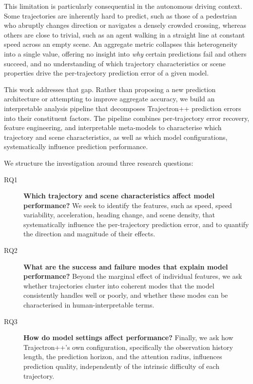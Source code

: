 \documentclass[12pt]{article}
\begin{document}
This limitation is particularly consequential in the autonomous driving context. Some trajectories are inherently hard to predict, such as those of a pedestrian who abruptly changes direction or navigates a densely crowded crossing, whereas others are close to trivial, such as an agent walking in a straight line at constant speed across an empty scene. An aggregate metric collapses this heterogeneity into a single value, offering no insight into \emph{why} certain predictions fail and others succeed, and no understanding of which trajectory characteristics or scene properties drive the per-trajectory prediction error of a given model.

This work addresses that gap. Rather than proposing a new prediction architecture or attempting to improve aggregate accuracy, we build an interpretable analysis pipeline that decomposes Trajectron++ prediction errors into their constituent factors. The pipeline combines per-trajectory error recovery, feature engineering, and interpretable meta-models to characterise which trajectory and scene characteristics, as well as which model configurations, systematically influence prediction performance.

We structure the investigation around three research questions:

\begin{description}
  \item[RQ1] \textbf{Which trajectory and scene characteristics affect model performance?} We seek to identify the features, such as speed, speed variability, acceleration, heading change, and scene density, that systematically influence the per-trajectory prediction error, and to quantify the direction and magnitude of their effects.

  \item[RQ2] \textbf{What are the success and failure modes that explain model performance?} Beyond the marginal effect of individual features, we ask whether trajectories cluster into coherent modes that the model consistently handles well or poorly, and whether these modes can be characterised in human-interpretable terms.

  \item[RQ3] \textbf{How do model settings affect performance?} Finally, we ask how Trajectron++'s own configuration, specifically the observation history length, the prediction horizon, and the attention radius, influences prediction quality, independently of the intrinsic difficulty of each trajectory.
\end{description}
\end{document}
